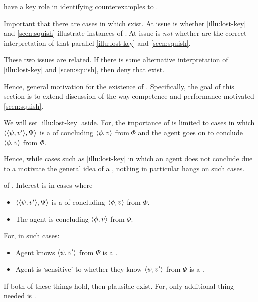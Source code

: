 \begin{note}
   have a key role in identifying counterexamples to \issueConstraint{}.

  Important that there are cases in which  exist.
  At issue is whether  \ref{illu:lost-key} and \ref{scen:squish} illustrate instances of .
  At issue is \emph{not} whether  are the correct interpretation of  that parallel  \ref{illu:lost-key} and \ref{scen:squish}.

  These two issues are related.
  If there is some alternative interpretation of  \ref{illu:lost-key} and \ref{scen:squish}, then deny that  exist.

  Hence, general motivation for the existence of \requ{}.
  Specifically, the goal of this section is to extend discussion of the way competence and performance motivated \autoref{scen:squish}.

  We will set \autoref{illu:lost-key} aside.
  For, the importance of  is limited to cases in which \(\langle \langle \psi, v' \rangle, \Psi \rangle\) is a  of concluding \(\langle \phi, v \rangle\) from \(\Phi\) and the agent goes on to conclude \(\langle \phi, v \rangle\) from \(\Phi\).

  Hence, while cases such as \autoref{illu:lost-key} in which an agent does not conclude due to a \requ{} motivate the general idea of a \requ{}, nothing in particular hangs on such cases.
\end{note}

\begin{note}
   of .
  Interest is in cases where

  \begin{itemize}
  \item
    \(\langle \langle \psi, v' \rangle, \Psi \rangle\) is a \requ{} of concluding \(\langle \phi, v \rangle\) from \(\Phi\).
  \item
    The agent is concluding \(\langle \phi, v \rangle\) from \(\Phi\).
  \end{itemize}
  For, in such cases:
  \begin{itemize}
  \item
    Agent knows \(\langle \psi, v' \rangle\) from \(\Psi\) is a \fc{}.
  \item
    Agent is `sensitive' to whether they know \(\langle \psi, v' \rangle\) from \(\Psi\) is a \fc{}.
  \end{itemize}

  If both of these things hold, then plausible  exist.
  For, only additional thing needed is \ninf{}.
\end{note}

